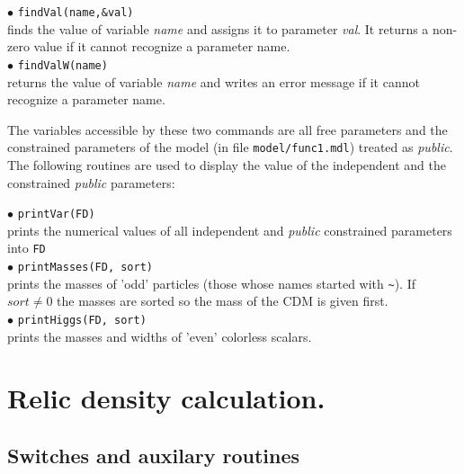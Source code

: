 \documentclass[12pt,a4paper]{article}
\begin{document}
\noindent
$\bullet$ \verb|findVal(name,&val)|\\
 finds the  value of
 variable  {\it name} and assigns it to parameter {\it val}. It returns a non-zero
value  if it cannot recognize  a parameter name.\\


\noindent
$\bullet$ \verb|findValW(name)| \\
returns the value of variable {\it name} and writes an error message
if it cannot recognize  a parameter name.

The variables accessible by these two commands are all free parameters and   the 
constrained parameters of the model (in file \verb|model/func1.mdl|)
treated as {\it public}. \\


The following routines are used to display the value of the independent and the constrained 
{\it public}
parameters: 


\noindent
$\bullet$ \verb|printVar(FD)|\\ 
prints the numerical values of all independent and {\it public} 
constrained parameters into \verb|FD|\\
$\bullet$ \verb|printMasses(FD, sort)|\\
 prints the masses of 'odd' particles
(those whose names  started with \verb|~|). If $sort\ne 0$
the masses are sorted so the mass of the CDM is given first.\\
$\bullet$ \verb|printHiggs(FD, sort)|\\
prints the masses and widths of 'even' colorless scalars.\\


\section{Relic density calculation.}
\subsection{Switches and auxilary routines}
\end{document}
